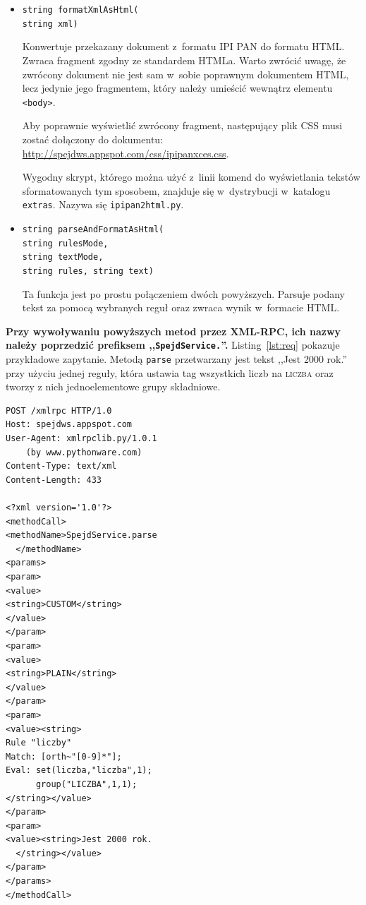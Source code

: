 \documentclass[11pt]{article}
\newcommand{\fn}[1]{\texttt{#1}}
\newcommand{\tag}[1]{\textsc{#1}}
\begin{document}
\begin{itemize}
  \item \fn{string formatXmlAsHtml(\\string xml)}

    Konwertuje przekazany dokument z~formatu IPI PAN do formatu HTML.
    Zwraca fragment zgodny ze standardem HTMLa. Warto zwrócić uwagę, że zwrócony
    dokument nie jest sam w~sobie poprawnym dokumentem HTML, lecz jedynie jego
    fragmentem, który należy umieścić wewnątrz elementu \texttt{<body>}.

    Aby poprawnie wyświetlić zwrócony fragment, następujący plik CSS musi
    zostać dołączony do dokumentu:
    \url{http://spejdws.appspot.com/css/ipipanxces.css}.
    
    Wygodny skrypt, którego można użyć z~linii komend do wyświetlania
    tekstów sformatowanych tym sposobem, znajduje się w~dystrybucji w~katalogu
    \texttt{extras}. Nazywa się \texttt{ipipan2html.py}.

  \item \fn{string parseAndFormatAsHtml(\\
    string rulesMode, \\
    string textMode, \\
    string rules, string text)}

    Ta funkcja jest po prostu połączeniem dwóch powyższych. Parsuje podany tekst
    za pomocą wybranych reguł oraz zwraca wynik w~formacie HTML.
\end{itemize}

\textbf{
Przy wywoływaniu powyższych metod przez XML-RPC, ich nazwy należy poprzedzić
prefiksem ,,\texttt{SpejdService.}''.} Listing~\ref{lst:req} pokazuje przykładowe
zapytanie. Metodą \fn{parse} przetwarzany jest tekst ,,Jest
2000 rok.'' przy użyciu jednej reguły, która ustawia tag wszystkich liczb na
\tag{liczba} oraz tworzy z nich jednoelementowe grupy składniowe.

\clearpage
\lstset{language=XML, caption=Przykład zapytania XML-RPC, label=lst:req}
\begin{lstlisting}[frame=trbl]
POST /xmlrpc HTTP/1.0
Host: spejdws.appspot.com
User-Agent: xmlrpclib.py/1.0.1
    (by www.pythonware.com)
Content-Type: text/xml
Content-Length: 433

<?xml version='1.0'?>
<methodCall>
<methodName>SpejdService.parse
  </methodName>
<params>
<param>
<value>
<string>CUSTOM</string>
</value>
</param>
<param>
<value>
<string>PLAIN</string>
</value>
</param>
<param>
<value><string>
Rule "liczby"
Match: [orth~"[0-9]*"];
Eval: set(liczba,"liczba",1);
      group("LICZBA",1,1);
</string></value>
</param>
<param>
<value><string>Jest 2000 rok.
  </string></value>
</param>
</params>
</methodCall>
\end{lstlisting} 
\end{document}
